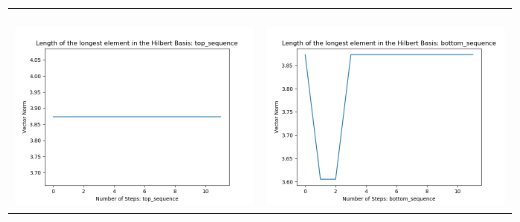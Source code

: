\documentclass[10pt]{article}
\begin{document}
\begin{tabular}{c|c}
\begin{minipage}{.45\textwidth}
\end{minipage} \\ \\
\hline \\\begin{minipage}{.45\textwidth}
\includegraphics[width=\textwidth]{"DATA/4d/5 generators 2 bound E/top_sequence LENGTH"}
\end{minipage} &
\begin{minipage}{.45\textwidth}
\includegraphics[width=\textwidth]{"DATA/4d/5 generators 2 bound E bottomup/bottom_sequence LENGTH"}
\end{minipage}
\end{tabular}
\end{document}
